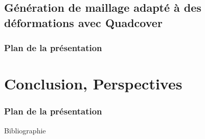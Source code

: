 \documentclass{beamer}
\begin{document}
\subsection{Génération de maillage adapté à des déformations avec Quadcover}
\begin{frame}
    \frametitle{Plan de la présentation}
    \tableofcontents[currentsubsection, sectionstyle=show/shaded, subsectionstyle=show/shaded/hide]
\end{frame}


\section{Conclusion, Perspectives}
\begin{frame}
    \frametitle{Plan de la présentation}
    \tableofcontents[currentsection, sectionstyle=show/shaded, subsectionstyle=show/show/hide]
\end{frame}



\begin{frame}[allowframebreaks]{Bibliographie}
    \printbibliography
\end{frame}
\frame{\titlepage}
\end{document}
